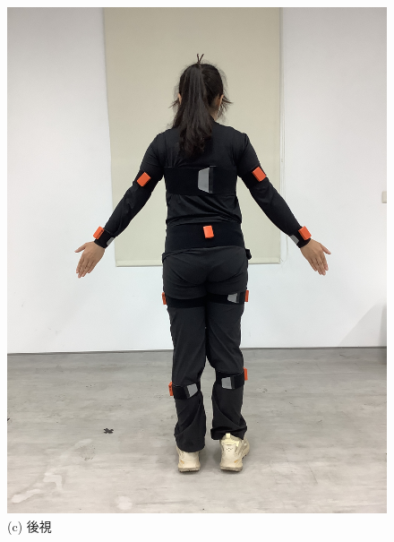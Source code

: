 \begin{figure}[!ht]
\begin{minipage}{.25\textwidth}
      \includegraphics[width=\linewidth, angle=-90]{figure/ch3_fig_backimu.JPG}
      \caption*{(c) 後視}
   \end{minipage}%
   \begin{minipage}{.25\textwidth}
     \centering

\end{minipage}
\end{figure}

